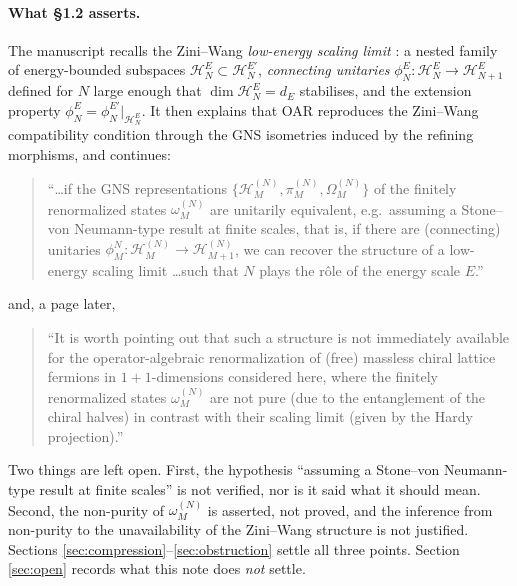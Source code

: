 \documentclass[11pt,a4paper]{article}
\theoremstyle{definition}
\newcommand{\cH}{\mathcal{H}}
\newcommand{\1}{\mathds{1}}
\begin{document}
\paragraph{What \S1.2 asserts.}
The manuscript recalls the Zini--Wang \emph{low-energy scaling limit} \cite{ZiniWang}: a nested
family of energy-bounded subspaces $\cH^{E}_{N}\subset\cH^{E'}_{N}$, \emph{connecting unitaries}
$\phi^{E}_{N}:\cH^{E}_{N}\rightarrow\cH^{E}_{N+1}$ defined for $N$ large enough that
$\dim\cH^{E}_{N}=d_{E}$ stabilises, and the extension property
$\phi^{E}_{N}=\phi^{E'}_{N}|_{\cH^{E}_{N}}$. It then explains that OAR reproduces the Zini--Wang
compatibility condition through the GNS isometries induced by the refining morphisms, and continues:
\begin{quote}
``\dots if the GNS representations $\{\cH_{M}^{(N)},\pi_{M}^{(N)},\Omega_{M}^{(N)}\}$ of the finitely
renormalized states $\omega^{(N)}_{M}$ are unitarily equivalent, e.g.~assuming a Stone--von
Neumann-type result at finite scales, that is, if there are (connecting) unitaries
$\phi^{N}_{M}:\cH^{(N)}_{M}\rightarrow\cH^{(N)}_{M+1}$, we can recover the structure of a low-energy
scaling limit \dots such that $N$ plays the r\^ole of the energy scale $E$.''
\end{quote}
and, a page later,
\begin{quote}
``It is worth pointing out that such a structure is not immediately available for the
operator-algebraic renormalization of (free) massless chiral lattice fermions in $1+1$-dimensions
considered here, where the finitely renormalized states $\omega^{(N)}_{M}$ are not pure (due to the
entanglement of the chiral halves) in contrast with their scaling limit (given by the Hardy
projection).''
\end{quote}
Two things are left open. First, the hypothesis ``assuming a Stone--von Neumann-type result at finite
scales'' is not verified, nor is it said what it should mean. Second, the non-purity of
$\omega^{(N)}_{M}$ is asserted, not proved, and the inference from non-purity to the unavailability
of the Zini--Wang structure is not justified. Sections
\ref{sec:compression}--\ref{sec:obstruction} settle all three points. Section \ref{sec:open} records
what this note does \emph{not} settle.
\end{document}
